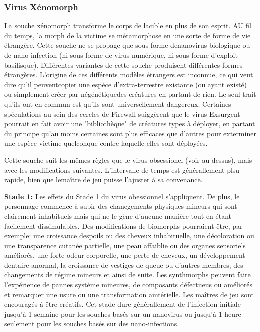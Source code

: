 \subsubsection{Virus Xénomorph} 

La souche xénomorph transforme le corps de lacible en plus de son esprit. AU fil du temps, la morph de la victime se métamorphose en une sorte de forme de vie étrangère. Cette souche ne se propage que sous forme denanovirus biologique ou de nano-infection (ni sous forme de virus numérique, ni sous forme d'exploit basilisque). Différentes variantes de cette souche produisent différentes formes étrangères. L'origine de ces différents modèles étrangers est inconnue, ce qui veut dire qu'il peuventcopier une espèce d'extra-terrestre existante (ou ayant existé) ou simplement créer par négénétiquedes créatures en partant de rien. Le seul trait qu'ils ont en commun est qu'ils sont universellement dangereux. Certaines spéculations au sein des cercles de Firewall suiggèrent que le virus Exsurgent pourrait en fait avoir une "bibliothèque" de créatures types à déployer, en partant du principe qu'au moins certaines sont plus efficaces que d'autres pour exterminer une espèce victime quelconque contre laquelle elles sont déployées. 

Cette souche suit les mêmes règles que le virus obsessionel (voir au-dessus), mais avec les modifications suivantes. L'intervalle de temps est générallement plsu rapide, bien que lemaître de jeu puisse l'ajuster à sa convenance. 

\textbf{Stade 1:} Les effets du Stade 1 du virus obessionnel s'appliquent. De plus, le personnage commence à subir des chanegements physiques mineurs qui sont clairement inhabituels mais qui ne le gène d'aucune manière tout en étant facilement dissimulables. Des modifications de biomorphs pourraient être, par exemple: une croissance despoils ou des cheveux inhabituelle, une décoloration ou une transparence cutanée partielle, une peau affaiblie ou des organes sensoriels améliorés, une forte odeur corporelle, une perte de cheveux, un développement dentaire anormal, la croissance de vestiges de queue ou d'autres membres, des changements de régime mineurs et ainsi de suite. Les synthmorphs peuvent faire l'expérience de pannes système mineures, de composants défectueus ou améliorés et remarquer une usure ou une transformation amtérielle. Les maîtres de jeu sont encouragés à être créatifs. Cet stade dure générallement de l'infection initiale jusqu'à 1 semaine pour les souches basés sur un nanovirus ou jusqu'à 1 heure seulement pour les souches basés sur des nano-infections. 

